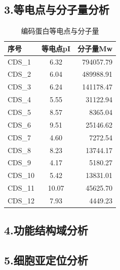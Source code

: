 \documentclass[supercite]{HustGraduPaper}
\begin{document}
	\subsection{3.等电点与分子量分析}
	\begin{table}[H]
  \begin{center}
    \caption{编码蛋白等电点与分子量}
    \begin{tabular}{l|c|r} %
      \textbf{序号} & \textbf{等电点pI} & \textbf{分子量Mw}\\
      \hline
			  CDS\_1 & 6.32 & 794057.79\\
        CDS\_2 & 6.04 & 489988.91\\ 
        CDS\_3 & 6.24 & 141178.47\\
        CDS\_4 & 5.55 & 31122.94\\
        CDS\_5 & 8.57 & 8365.04\\
        CDS\_6 & 9.51 & 25146.62\\
        CDS\_7 & 4.60 & 7272.54\\
  	    CDS\_8 & 8.23 & 13744.17\\
  	    CDS\_9 & 4.17 & 5180.27\\
  	    CDS\_10 & 5.42 & 13831.01\\
  	    CDS\_11 & 10.07 & 45625.70\\
  	    CDS\_12 & 7.93 & 4449.23\\
    \end{tabular}
  \end{center}
\end{table}
	\subsection{4.功能结构域分析}

	\subsection{5.细胞亚定位分析}
\end{document}
